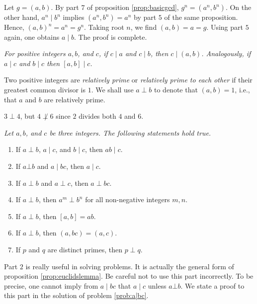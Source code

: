 \documentclass{subfile}
\begin{document}
	\begin{solution}
		Let $g=(a,b)$. By part $7$ of proposition \eqref{prop:basicgcd}, $g^n = (a^n,b^n)$. On the other hand, $a^n\mid b^n$ implies $(a^n, b^n)=a^n$ by part $5$ of the same proposition. Hence, $(a, b)^n=a^n=g^n$. Taking root $n$, we find $(a,b)=a=g$. Using part $5$ again, one obtains $a\mid b$. The proof is complete.

	\end{solution}

	\begin{proposition}\slshape\label{prop:dividegcd}
		For positive integers $a, b$, and $c$, if $c \mid a$ and $c\mid b$, then $c\mid (a,b)$. Analogously, if $a\mid c$ and $b\mid c$ then $[a,b]\mid c$.
	\end{proposition}

	\begin{definition}
		Two positive integers are \textit{relatively prime} or \textit{relatively prime to each other} if their greatest common divisor is $1$. We shall use $a\perp b$ to denote that $(a,b)=1$, i.e., that $a$ and $b$ are relatively prime.
	\end{definition}

	\begin{example}
		$3\perp4$, but $4\not\perp6$ since $2$ divides both $4$ and $6$.
	\end{example}

	\begin{proposition}\slshape\label{prop:cpdiv}
		Let $a, b$, and $c$ be three integers. The following statements hold true.
		\begin{enumerate}
			\item If $a\perp b$, $a\mid c$, and $b\mid c$, then $ab\mid c$.
			\item If $a \bot b$ and $a\mid bc$, then $a\mid c$.
			\item If $a\perp b$ and $a\perp c$, then $a\perp bc$.
			\item If $a\perp b$, then $a^m\perp b^n$ for all non-negative integers $m,n$.
			\item If $a \perp b$, then $[a,b]=ab$.
			\item If $a \perp b$, then $(a,bc)=(a,c)$.
			\item If $p$ and $q$ are distinct primes, then $p \perp q$.
		\end{enumerate}
	\end{proposition}

	\begin{note}[1]
		Part $2$ is really useful in solving problems. It is actually the general form of proposition \eqref{prop:euclidslemma}. Be careful not to use this part incorrectly. To be precise, one cannot imply from $a\mid bc$ that $a\mid c$ unless $a \bot b$. We state a proof to this part in the solution of problem \eqref{prob:a|bc}.
	\end{note}
\end{document}
